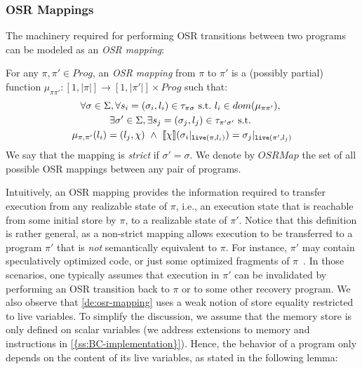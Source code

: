 \subsubsection{OSR Mappings}
\label{ss:osr-mapping}

The machinery required for performing OSR transitions between two programs can be modeled as an {\em OSR mapping}:

\begin{definition}
\label{de:osr-mapping}
For any $\pi,\pi'\in Prog$, an {\em OSR mapping} from $\pi$ to $\pi'$ is a (possibly partial) function
$\mu_{\pi\pi'}:[1,|\pi|]\rightarrow [1,|\pi'|]\times Prog$ such that:
\begin{gather*}
\forall \sigma\in\Sigma, \forall s_i=(\sigma_i,l_i)\in\tau_{\pi\sigma}~\text{s.t.}~l_i\in dom(\mu_{\pi\pi'}),~\\
\exists \sigma'\in\Sigma, \exists s_j=(\sigma_j,l_j)\in\tau_{\pi'\sigma'}~\text{s.t.}~\\
\mu_{\pi,\pi'}(l_i)=(l_j,\chi)~\wedge~[\![\chi]\!](\sigma_i\vert_{\text{${\tt live}$}(\pi,l_i)})=\sigma_j\vert_{\text{${\tt live}$}(\pi',l_j)}
\end{gather*}
We say that the mapping is {\em strict} if $\sigma'=\sigma$. We denote by $OSRMap$ the set of all possible OSR mappings between any pair of programs.
\end{definition}

\noindent Intuitively, an OSR mapping provides the information required to transfer execution from any realizable state of $\pi$, i.e., an execution state that is reachable from some initial store by $\pi$, to a realizable state of $\pi'$. Notice that this definition is rather general, as a non-strict mapping allows execution to be transferred to a program $\pi'$ that is {\em not} semantically equivalent to $\pi$. For instance, $\pi'$ may contain speculatively optimized code, or just some optimized fragments of $\pi$~\cite{Guo11, Bala00, Gal09}. In those scenarios, one typically assumes that execution in $\pi'$ can be invalidated by performing an OSR transition back to $\pi$ or to some other recovery program. We also observe that \mydefinition\ref{de:osr-mapping} uses a weak notion of store equality restricted to live variables. To simplify the discussion, we assume that the memory store is only defined on scalar variables (we address extensions to memory  and  instructions in \mysection\ref{{ss:BC-implementation}}). Hence, the behavior of a program only depends on the content of its live variables, as stated in the following lemma:

